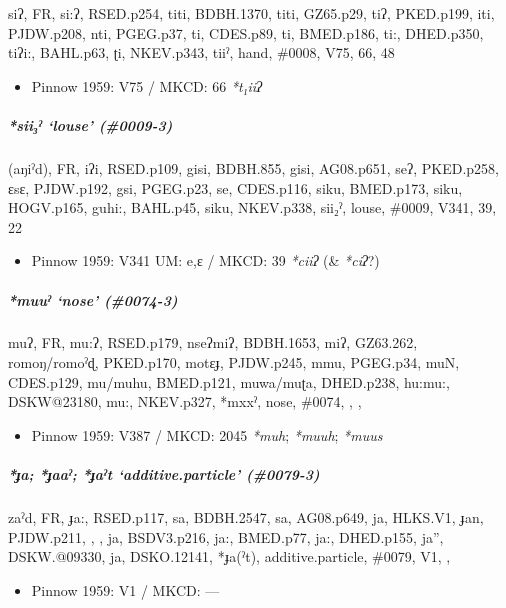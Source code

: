 \documentclass[a4paper,]{article}
\providecommand{\tightlist}{%
  \setlength{\itemsep}{0pt}\setlength{\parskip}{0pt}}
\let\oldsubparagraph\subparagraph
\renewcommand{\subparagraph}[1]{\oldsubparagraph{#1}\mbox{}}
\begin{document}
siʔ, FR, si:ʔ, RSED.p254, titi, BDBH.1370, titi, GZ65.p29, tiʔ,
PKED.p199, iti, PJDW.p208, nti, PGEG.p37, ti, CDES.p89, ti, BMED.p186,
ti:, DHED.p350, tiʔi:, BAHL.p63, ʈi, NKEV.p343, tiiˀ, hand, \#0008, V75,
66, 48

\begin{itemize}
\tightlist
\item
  Pinnow 1959: V75 / MKCD: 66 \emph{*t₁iiʔ}
\end{itemize}

\subparagraph{\texorpdfstring{\emph{*sii₃ˀ} `louse'
(\#0009-3)}{*sii₃ˀ louse (\#0009-3)}}\label{siiux2c0-louse-0009-3}

(aŋiˀd), FR, iʔi, RSED.p109, gisi, BDBH.855, gisi, AG08.p651, seʔ,
PKED.p258, ɛsɛ, PJDW.p192, gsi, PGEG.p23, se, CDES.p116, siku,
BMED.p173, siku, HOGV.p165, guhi:, BAHL.p45, siku, NKEV.p338, sii₂ˀ,
louse, \#0009, V341, 39, 22

\begin{itemize}
\tightlist
\item
  Pinnow 1959: V341 UM: e,ɛ / MKCD: 39 \emph{*ciiʔ} (\& \emph{*ciʔ}?)
\end{itemize}

\subparagraph{\texorpdfstring{\emph{*muuˀ} `nose'
(\#0074-3)}{*muuˀ nose (\#0074-3)}}\label{muuux2c0-nose-0074-3}

muʔ, FR, mu:ʔ, RSED.p179, nseʔmiʔ, BDBH.1653, miʔ, GZ63.262,
romoŋ/romoˀɖ, PKED.p170, motɛɟ, PJDW.p245, mmu, PGEG.p34, muN,
CDES.p129, mu/muhu, BMED.p121, muwa/muʈa, DHED.p238, hu:mu:, DSKW@23180,
mu:, NKEV.p327, *mxxˀ, nose, \#0074, , ,

\begin{itemize}
\tightlist
\item
  Pinnow 1959: V387 / MKCD: 2045 \emph{*muh}; \emph{*muuh}; \emph{*muus}
\end{itemize}

\subparagraph{\texorpdfstring{\emph{*ɟa}; \emph{*ɟaaˀ}; \emph{*ɟaˀt}
`additive.particle'
(\#0079-3)}{*ɟa; *ɟaaˀ; *ɟaˀt additive.particle (\#0079-3)}}\label{ux25fa-ux25faaux2c0-ux25faux2c0t-additive.particle-0079-3}

zaˀd, FR, ɟa:, RSED.p117, sa, BDBH.2547, sa, AG08.p649, ja, HLKS.V1,
ɟan, PJDW.p211, , , ja, BSDV3.p216, ja:, BMED.p77, ja:, DHED.p155, ja'',
DSKW.@09330, ja, DSKO.12141, *ɟa(ˀt), additive.particle, \#0079, V1, ,

\begin{itemize}
\tightlist
\item
  Pinnow 1959: V1 / MKCD: ---
\end{itemize}
\end{document}

